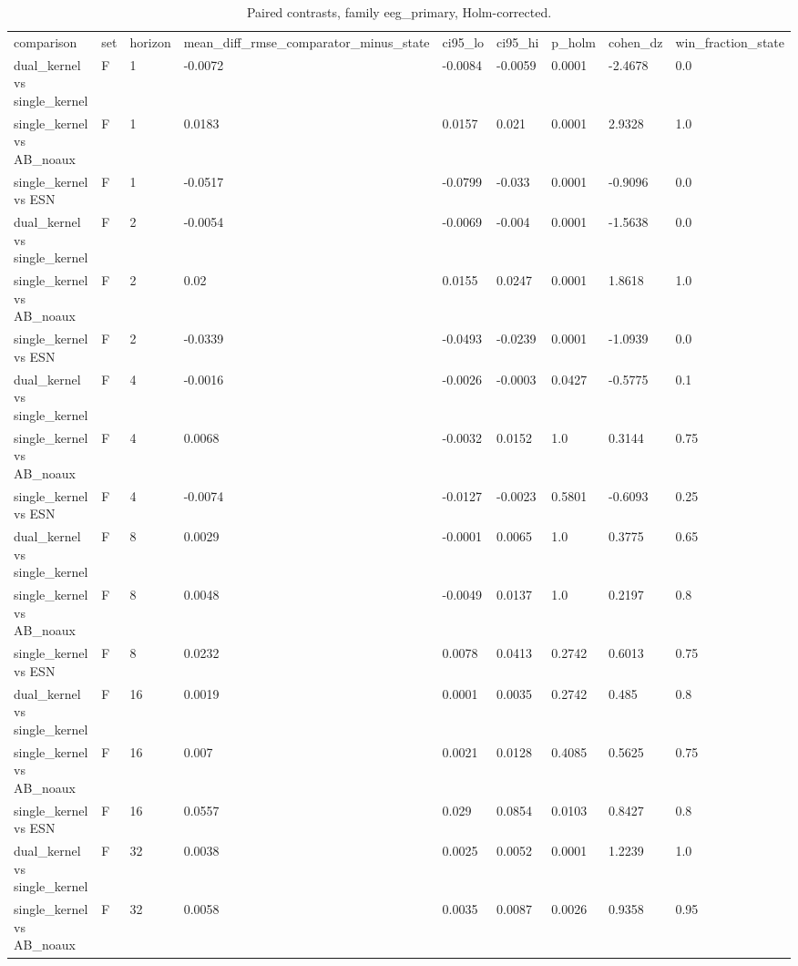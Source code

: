 \begin{table}
\caption{Paired contrasts, family eeg\_primary, Holm-corrected.}
\label{tab:eeg_contrasts}
\begin{ruledtabular}
\begin{tabular}{lllllllll}
comparison & set & horizon & mean_diff_rmse_comparator_minus_state & ci95_lo & ci95_hi & p_holm & cohen_dz & win_fraction_state \\
dual_kernel vs single_kernel & F & 1 & -0.0072 & -0.0084 & -0.0059 & 0.0001 & -2.4678 & 0.0 \\
single_kernel vs AB_noaux & F & 1 & 0.0183 & 0.0157 & 0.021 & 0.0001 & 2.9328 & 1.0 \\
single_kernel vs ESN & F & 1 & -0.0517 & -0.0799 & -0.033 & 0.0001 & -0.9096 & 0.0 \\
dual_kernel vs single_kernel & F & 2 & -0.0054 & -0.0069 & -0.004 & 0.0001 & -1.5638 & 0.0 \\
single_kernel vs AB_noaux & F & 2 & 0.02 & 0.0155 & 0.0247 & 0.0001 & 1.8618 & 1.0 \\
single_kernel vs ESN & F & 2 & -0.0339 & -0.0493 & -0.0239 & 0.0001 & -1.0939 & 0.0 \\
dual_kernel vs single_kernel & F & 4 & -0.0016 & -0.0026 & -0.0003 & 0.0427 & -0.5775 & 0.1 \\
single_kernel vs AB_noaux & F & 4 & 0.0068 & -0.0032 & 0.0152 & 1.0 & 0.3144 & 0.75 \\
single_kernel vs ESN & F & 4 & -0.0074 & -0.0127 & -0.0023 & 0.5801 & -0.6093 & 0.25 \\
dual_kernel vs single_kernel & F & 8 & 0.0029 & -0.0001 & 0.0065 & 1.0 & 0.3775 & 0.65 \\
single_kernel vs AB_noaux & F & 8 & 0.0048 & -0.0049 & 0.0137 & 1.0 & 0.2197 & 0.8 \\
single_kernel vs ESN & F & 8 & 0.0232 & 0.0078 & 0.0413 & 0.2742 & 0.6013 & 0.75 \\
dual_kernel vs single_kernel & F & 16 & 0.0019 & 0.0001 & 0.0035 & 0.2742 & 0.485 & 0.8 \\
single_kernel vs AB_noaux & F & 16 & 0.007 & 0.0021 & 0.0128 & 0.4085 & 0.5625 & 0.75 \\
single_kernel vs ESN & F & 16 & 0.0557 & 0.029 & 0.0854 & 0.0103 & 0.8427 & 0.8 \\
dual_kernel vs single_kernel & F & 32 & 0.0038 & 0.0025 & 0.0052 & 0.0001 & 1.2239 & 1.0 \\
single_kernel vs AB_noaux & F & 32 & 0.0058 & 0.0035 & 0.0087 & 0.0026 & 0.9358 & 0.95 \\

\end{tabular}
\end{ruledtabular}
\end{table}
